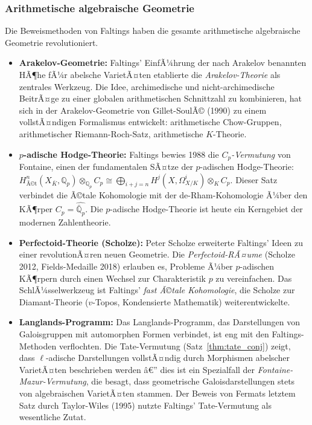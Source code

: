 ﻿\documentclass[12pt,a4paper]{article}
\theoremstyle{plain}
\theoremstyle{definition}
\theoremstyle{remark}
\newcommand{\Q}{\mathbb{Q}}
\begin{document}
\subsubsection{Arithmetische algebraische Geometrie}

Die Beweismethoden von Faltings haben die gesamte arithmetische algebraische Geometrie
revolutioniert.

\begin{itemize}[leftmargin=2em,itemsep=4pt]
  \item \textbf{Arakelov-Geometrie:}
    Faltings' EinfÃ¼hrung der nach Arakelov benannten HÃ¶he fÃ¼r abelsche VarietÃ¤ten
    etablierte die \emph{Arakelov-Theorie} als zentrales Werkzeug. Die Idee,
    archimedische und nicht-archimedische BeitrÃ¤ge zu einer globalen arithmetischen
    Schnittzahl zu kombinieren, hat sich in der Arakelov-Geometrie von Gillet-SoulÃ© (1990)
    zu einem vollstÃ¤ndigen Formalismus entwickelt: arithmetische Chow-Gruppen,
    arithmetischer Riemann-Roch-Satz, arithmetische $K$-Theorie.

  \item \textbf{$p$-adische Hodge-Theorie:}
    Faltings bewies 1988 die \emph{$C_p$-Vermutung} von Fontaine, einen der
    fundamentalen SÃ¤tze der $p$-adischen Hodge-Theorie:
    $H^n_{\text{Ã©t}}(X_{\bar K}, \Q_p) \otimes_{\Q_p} C_p \cong
    \bigoplus_{i+j=n} H^j(X, \Omega^i_{X/K}) \otimes_K C_p$.
    Dieser Satz verbindet die Ã©tale Kohomologie mit der de-Rham-Kohomologie
    Ã¼ber den KÃ¶rper $C_p = \widehat{\bar{\Q}_p}$. Die $p$-adische Hodge-Theorie
    ist heute ein Kerngebiet der modernen Zahlentheorie.

  \item \textbf{Perfectoid-Theorie (Scholze):}
    Peter Scholze erweiterte Faltings' Ideen zu einer revolutionÃ¤ren neuen Geometrie.
    Die \emph{Perfectoid-RÃ¤ume} (Scholze 2012, Fields-Medaille 2018) erlauben es,
    Probleme Ã¼ber $p$-adischen KÃ¶rpern durch einen Wechsel zur Charakteristik $p$
    zu vereinfachen. Das SchlÃ¼sselwerkzeug ist Faltings' \emph{fast Ã©tale Kohomologie},
    die Scholze zur Diamant-Theorie ($v$-Topos, Kondensierte Mathematik) weiterentwickelte.

  \item \textbf{Langlands-Programm:}
    Das Langlands-Programm, das Darstellungen von Galoisgruppen mit automorphen Formen
    verbindet, ist eng mit den Faltings-Methoden verflochten.
    Die Tate-Vermutung (Satz~\ref{thm:tate_conj}) zeigt, dass $\ell$-adische Darstellungen
    vollstÃ¤ndig durch Morphismen abelscher VarietÃ¤ten beschrieben werden â€”
    dies ist ein Spezialfall der \emph{Fontaine-Mazur-Vermutung}, die besagt,
    dass geometrische Galoisdarstellungen stets von algebraischen VarietÃ¤ten stammen.
    Der Beweis von Fermats letztem Satz durch Taylor-Wiles (1995) nutzte Faltings'
    Tate-Vermutung als wesentliche Zutat.


\end{itemize}
\end{document}
